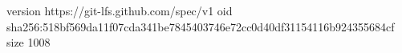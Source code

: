 version https://git-lfs.github.com/spec/v1
oid sha256:518bf569da11f07cda341be7845403746e72cc0d40df31154116b924355684cf
size 1008
